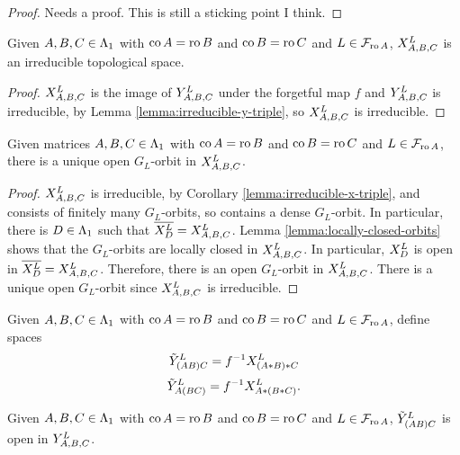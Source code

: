 \documentclass[a4paper, 11pt]{report}
\begin{document}
{\color{blue}
\begin{proof}
Needs a proof. This is still a sticking point I think.
\end{proof}
}

\begin{corollary}\label{lemma:irreducible-x-triple}
Given $A,B,C\in\matrices$ with $\co{A}=\ro{B}$ and $\co{B}=\ro{C}$ and $L\in\flags_{\ro{A}}$, $\xprod[L]{A,B,C}$ is an irreducible topological space.
\end{corollary}

\begin{proof}
$\xprod[L]{A,B,C}$ is the image of $\yprod[L]{A,B,C}$ under the forgetful map $f$ and $\yprod[L]{A,B,C}$ is irreducible, by Lemma \ref{lemma:irreducible-y-triple}, so $\xprod[L]{A,B,C}$ is irreducible.
\end{proof}

\begin{lemma}\label{lemma:generic-triple-product}
Given matrices $A,B,C\in\matrices$ with $\co{A}=\ro{B}$ and $\co{B}=\ro{C}$ and $L\in\flags_{\ro{A}}$, there is a unique open $G_L$-orbit in $\xprod[L]{A,B,C}$.
\end{lemma}

\begin{proof}
$\xprod[L]{A,B,C}$ is irreducible, by Corollary \ref{lemma:irreducible-x-triple}, and consists of finitely many $G_L$-orbits, so contains a dense $G_L$-orbit. In particular, there is $D\in\matrices$ such that $\overline{\xprod[L]{D}}=\xprod[L]{A,B,C}$. Lemma \ref{lemma:locally-closed-orbits} shows that the $G_L$-orbits are locally closed in $\xprod[L]{A,B,C}$. In particular, $\xprod[L]{D}$ is open in $\overline{\xprod[L]{D}} = \xprod[L]{A,B,C}$. Therefore, there is an open $G_L$-orbit in $\xprod[L]{A,B,C}$. There is a unique open $G_L$-orbit since $\xprod[L]{A,B,C}$ is irreducible.
\end{proof}

\begin{definition}
Given $A,B,C\in\matrices$ with $\co{A}=\ro{B}$ and $\co{B}=\ro{C}$ and $L\in\flags_{\ro{A}}$, define spaces
\begin{equation*}
\zprod[L]{(AB)C} = f^{-1}\xprod[L]{(A\ast B)\ast C}
\end{equation*}
\begin{equation*}
\zprod[L]{A(BC)} = f^{-1}\xprod[L]{A\ast(B\ast C)}.
\end{equation*}
\end{definition}

\begin{lemma}\label{lemma:zprod-open-in-yprod-left}
Given $A,B,C\in\matrices$ with $\co{A}=\ro{B}$ and $\co{B}=\ro{C}$ and $L\in\flags_{\ro{A}}$, $\zprod[L]{(AB)C}$ is open in $\yprod[L]{A,B,C}$.
\end{lemma}
\end{document}
